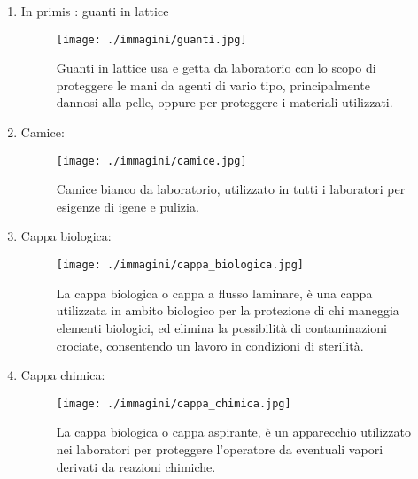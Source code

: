 \documentclass{article}
\begin{document}
	\begin{enumerate}

		\item In primis : guanti in lattice

		\begin{figure}[H]

			\texttt{[image: ./immagini/guanti.jpg]}
			\caption{Guanti in lattice usa e getta da laboratorio con lo scopo di proteggere le mani da agenti di vario tipo, principalmente dannosi alla pelle,
			oppure per proteggere i materiali utilizzati.}
			\label{guanti}

		\end{figure}

		\vspace{0.5cm}


		\item Camice:

		\begin{figure}[H]

			\texttt{[image: ./immagini/camice.jpg]}
			\caption{Camice bianco da laboratorio, utilizzato in tutti i laboratori per esigenze di igene e pulizia.}
			\label{camice}

		\end{figure}

		\vspace{0.5cm}


		\item Cappa biologica:

		\begin{figure}[H]

			\texttt{[image: ./immagini/cappa\_biologica.jpg]}
			\caption{La cappa biologica o cappa a flusso laminare, è una cappa utilizzata in ambito biologico per la protezione di chi maneggia elementi
			biologici, ed elimina la possibilità di contaminazioni crociate, consentendo un lavoro in condizioni di sterilità.}
			\label{cappa_biologica}

		\end{figure}

		\vspace{0.5cm}


		\item Cappa chimica:

		\begin{figure}[H]

			\texttt{[image: ./immagini/cappa\_chimica.jpg]}
			\caption{La cappa biologica o cappa aspirante, è un apparecchio utilizzato nei laboratori per proteggere l'operatore da eventuali vapori derivati da reazioni chimiche.}
			\label{cappa_chimica}


\end{figure}
\end{enumerate}
\end{document}
